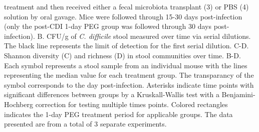 \documentclass[
  11pt,
]{article}
\begin{document}
treatment and then received either a fecal microbiota transplant (3) or
PBS (4) solution by oral gavage. Mice were followed through 15-30 days
post-infection (only the post-CDI 1-day PEG group was followed through
30 days post-infection). B. CFU/g of \emph{C. difficile} stool measured
over time via serial dilutions. The black line represents the limit of
detection for the first serial dilution. C-D. Shannon diversity (C) and
richness (D) in stool communities over time. B-D. Each symbol represents
a stool sample from an individual mouse with the lines representing the
median value for each treatment group. The transparancy of the symbol
corresponds to the day post-infection. Asterisks indicate time points
with significant differences between groups by a Kruskall-Wallis test
with a Benjamini-Hochberg correction for testing multiple times points.
Colored rectangles indicates the 1-day PEG treatment period for
applicable groups. The data presented are from a total of 3 separate
experiments. \newpage
\end{document}
